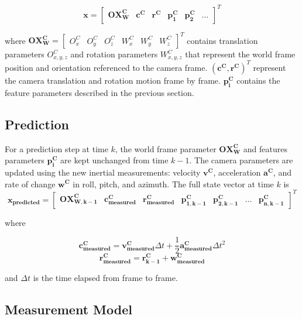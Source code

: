 \begin{equation}
\mathbf{x}=\begin{bmatrix}
\mathbf{OX_{W}^{C}} & \mathbf{c^{C}} & \mathbf{r^{C}} & 
\mathbf{p_{1}^{C}} & \mathbf{p_{2}^{C}} & \ldots 
\end{bmatrix}^T
\end{equation}

\noindent where $\mathbf{OX_{W}^{C}}= \begin{bmatrix}O_{x}^{C} &
  O_{y}^{C} & O_{z}^{C} & W_{x}^{C} & W_{y}^{C} &
  W_{z}^{C} \end{bmatrix}^{T}$ contains translation parameters
$O_{x,y,z}^{C}$ and rotation parameters $W_{x,y,z}^{C}$ that represent
the world frame position and orientation referenced to the camera
frame. $\left(\mathbf{c^{C}},\mathbf{r^{C}}\right)^{T}$ represent the
camera translation and rotation motion frame by frame.
$\mathbf{p_{i}^{C}}$ contains the feature parameters described in
the previous section.

\subsection{Prediction}

For a prediction step at time $k$, the world frame parameter
$\mathbf{OX_W^C}$ and features parameters $\mathbf{p_i^C}$ are kept
unchanged from time $k-1$. The camera parameters are updated using the
new inertial measurements: velocity $\mathbf{v^{C}}$, acceleration
$\mathbf{a^{C}}$, and rate of change $\mathbf{w^{C}}$ in roll, pitch, and
azimuth. The full state vector at time $k$ is
\begin{equation}
\mathbf{x_{predicted}}
=\begin{bmatrix}
\mathbf{OX_{W,k-1}^{C}} & 
\mathbf{c_{measured}^{C}} &
\mathbf{r_{measured}^{C}} & 
\mathbf{p_{1,k-1}^{C}} & 
\mathbf{p_{2,k-1}^{C}} & 
\ldots & 
\mathbf{p_{n,k-1}^C}
\end{bmatrix}^T
\end{equation}

\noindent where 

$$\mathbf{c_{measured}^{C}}=\mathbf{v_{measured}^{C}}\Delta t+ 
\frac{1}{2}\mathbf{a_{measured}^{C}}\Delta t^{2}$$
$$\mathbf{r_{measured}^{C}}=\mathbf{r_{k-1}^{C}}+ \mathbf{w_{measured}^{C}}$$

\noindent and $\Delta t$ is the time elapsed from frame to frame. 

\subsection{Measurement Model}

